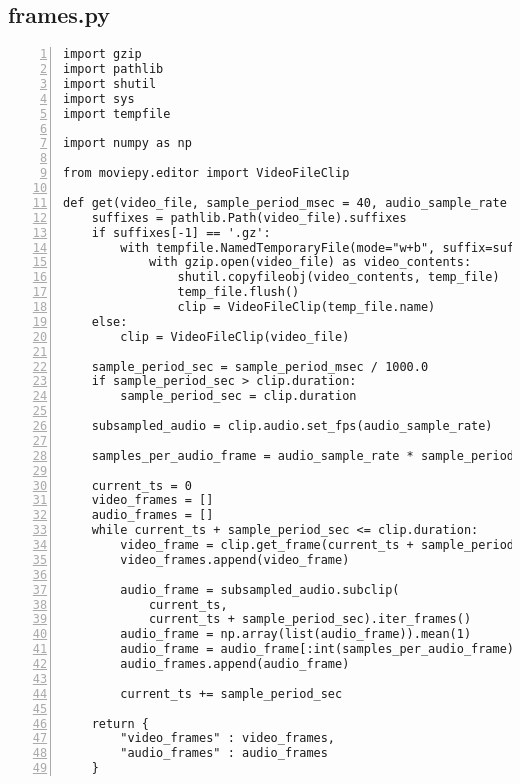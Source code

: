 \subsection{frames.py}
\label{subsec:frames.py}

{\setlength{\fboxsep}{10pt}
\scriptsize
\begin{Verbatim}[frame=leftline, numbers=left, xleftmargin=5mm]
import gzip
import pathlib
import shutil
import sys
import tempfile

import numpy as np

from moviepy.editor import VideoFileClip

def get(video_file, sample_period_msec = 40, audio_sample_rate = 16000):
    suffixes = pathlib.Path(video_file).suffixes
    if suffixes[-1] == '.gz':
        with tempfile.NamedTemporaryFile(mode="w+b", suffix=suffixes[-2]) as temp_file:
            with gzip.open(video_file) as video_contents:
                shutil.copyfileobj(video_contents, temp_file)
                temp_file.flush()
                clip = VideoFileClip(temp_file.name)
    else:
        clip = VideoFileClip(video_file)

    sample_period_sec = sample_period_msec / 1000.0
    if sample_period_sec > clip.duration:
        sample_period_sec = clip.duration

    subsampled_audio = clip.audio.set_fps(audio_sample_rate)

    samples_per_audio_frame = audio_sample_rate * sample_period_sec

    current_ts = 0
    video_frames = []
    audio_frames = []
    while current_ts + sample_period_sec <= clip.duration:
        video_frame = clip.get_frame(current_ts + sample_period_sec/2)
        video_frames.append(video_frame)

        audio_frame = subsampled_audio.subclip(
            current_ts,
            current_ts + sample_period_sec).iter_frames()
        audio_frame = np.array(list(audio_frame)).mean(1)
        audio_frame = audio_frame[:int(samples_per_audio_frame)]
        audio_frames.append(audio_frame)

        current_ts += sample_period_sec

    return {
        "video_frames" : video_frames,
        "audio_frames" : audio_frames
    }
\end{Verbatim}
}
